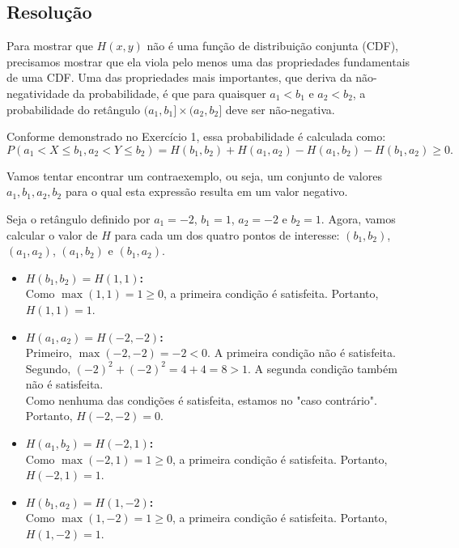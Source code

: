 \documentclass[12pt]{article}
\begin{document}
\subsection*{Resolução}

Para mostrar que $H(x,y)$ não é uma função de distribuição conjunta (CDF), precisamos mostrar que ela viola pelo menos uma das propriedades fundamentais de uma CDF. Uma das propriedades mais importantes, que deriva da não-negatividade da probabilidade, é que para quaisquer $a_1 < b_1$ e $a_2 < b_2$, a probabilidade do retângulo $(a_1, b_1] \times (a_2, b_2]$ deve ser não-negativa.

Conforme demonstrado no Exercício 1, essa probabilidade é calculada como:
\[ P(a_1 < X \le b_1, a_2 < Y \le b_2) = H(b_1, b_2) + H(a_1, a_2) - H(a_1, b_2) - H(b_1, a_2) \ge 0. \]

Vamos tentar encontrar um contraexemplo, ou seja, um conjunto de valores $a_1, b_1, a_2, b_2$ para o qual esta expressão resulta em um valor negativo.

Seja o retângulo definido por $a_1 = -2$, $b_1 = 1$, $a_2 = -2$ e $b_2 = 1$.
Agora, vamos calcular o valor de $H$ para cada um dos quatro pontos de interesse: $(b_1, b_2)$, $(a_1, a_2)$, $(a_1, b_2)$ e $(b_1, a_2)$.

\begin{itemize}
    \item \textbf{$H(b_1, b_2) = H(1, 1)$:} \\
    Como $\max(1,1) = 1 \ge 0$, a primeira condição é satisfeita. Portanto, $H(1,1) = 1$.

    \item \textbf{$H(a_1, a_2) = H(-2, -2)$:} \\
    Primeiro, $\max(-2,-2) = -2 < 0$. A primeira condição não é satisfeita. \\
    Segundo, $(-2)^2 + (-2)^2 = 4 + 4 = 8 > 1$. A segunda condição também não é satisfeita. \\
    Como nenhuma das condições é satisfeita, estamos no "caso contrário". Portanto, $H(-2,-2) = 0$.

    \item \textbf{$H(a_1, b_2) = H(-2, 1)$:} \\
    Como $\max(-2,1) = 1 \ge 0$, a primeira condição é satisfeita. Portanto, $H(-2,1) = 1$.

    \item \textbf{$H(b_1, a_2) = H(1, -2)$:} \\
    Como $\max(1,-2) = 1 \ge 0$, a primeira condição é satisfeita. Portanto, $H(1,-2) = 1$.
\end{itemize}
\end{document}

